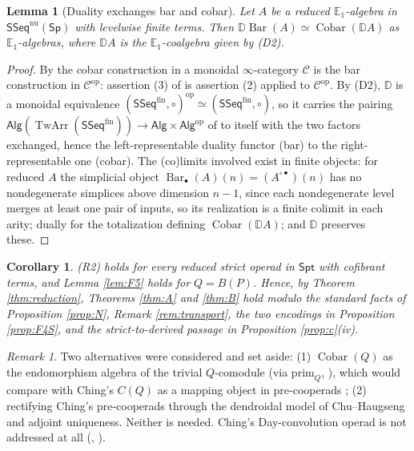 \documentclass[11pt]{amsart}
\newtheorem{lemma}[subsection]{Lemma}
\newtheorem{corollary}[subsection]{Corollary}
\theoremstyle{definition}
\theoremstyle{remark}
\newtheorem{remark}[subsection]{Remark}
\newcommand{\Spt}{\mathsf{Spt}}
\newcommand{\Sp}{\mathsf{Sp}}
\newcommand{\SSeq}{\mathsf{SSeq}}
\newcommand{\Alg}{\mathsf{Alg}}
\newcommand{\dual}{\mathbb{D}}
\newcommand{\BarC}{\operatorname{Bar}}
\newcommand{\Cobar}{\operatorname{Cobar}}
\newcommand{\TwArr}{\operatorname{TwArr}}
\begin{document}
\begin{lemma}[Duality exchanges bar and cobar]\label{lem:dualbar}
Let $A$ be a reduced $\mathbb{E}_1$-algebra in $\SSeq^{\mathrm{nu}}(\Sp)$ with levelwise finite terms. Then $\dual\BarC(A)\simeq\Cobar(\dual A)$ as $\mathbb{E}_1$-algebras, where $\dual A$ is the $\mathbb{E}_1$-coalgebra given by (D2).
\end{lemma}
\begin{proof}
By \cite[Remark 5.2.2.18]{HA} the cobar construction in a monoidal $\infty$-category $\mathcal C$ is the bar construction in $\mathcal C^{\mathrm{op}}$: assertion (3) of \cite[Theorem 5.2.2.17]{HA} is assertion (2) applied to $\mathcal C^{\mathrm{op}}$. By (D2), $\dual$ is a monoidal equivalence $(\SSeq^{\mathrm{fin}},\circ)^{\mathrm{op}}\simeq(\SSeq^{\mathrm{fin}},\circ)$, so it carries the pairing $\Alg(\TwArr(\SSeq^{\mathrm{fin}}))\to\Alg\times\Alg^{\mathrm{op}}$ of \cite[Theorem 5.2.2.17]{HA} to itself with the two factors exchanged, hence the left-representable duality functor (bar) to the right-representable one (cobar). The (co)limits involved exist in finite objects: for reduced $A$ the simplicial object $\BarC_\bullet(A)(n)=(A^{\circ\bullet})(n)$ has no nondegenerate simplices above dimension $n-1$, since each nondegenerate level merges at least one pair of inputs, so its realization is a finite colimit in each arity; dually for the totalization defining $\Cobar(\dual A)$; and $\dual$ preserves these.
\end{proof}

\begin{corollary}\label{cor:status}
(R2) holds for every reduced strict operad in $\Spt$ with cofibrant terms, and Lemma \ref{lem:F5} holds for $Q=B(P)$. Hence, by Theorem \ref{thm:reduction}, Theorems \ref{thm:A} and \ref{thm:B} hold modulo the standard facts of Proposition \ref{prop:N}, Remark \ref{rem:transport}, the two encodings in Proposition \ref{prop:F4S}, and the strict-to-derived passage in Proposition \ref{prop:c}(iv).
\end{corollary}

\begin{remark}
Two alternatives were considered and set aside: (1) $\Cobar(Q)$ as the endomorphism algebra of the trivial $Q$-comodule (via $\mathrm{prim}_Q$, \cite[Proposition 2.17]{BH}), which would compare with Ching's $C(Q)$ as a mapping object in pre-cooperads \cite[Proposition 3.12]{Ch12}; (2) rectifying Ching's pre-cooperads \cite[\S 3]{Ch12} through the dendroidal model of Chu--Haugseng \cite[\S 4, Theorem 4.4.3]{CH20} and adjoint uniqueness. Neither is needed. Ching's Day-convolution operad \cite{Ch21} is not addressed at all (\cite[Example 3.3]{Ch21}, \cite[\S 1.3]{BB}).
\end{remark}
\end{document}
